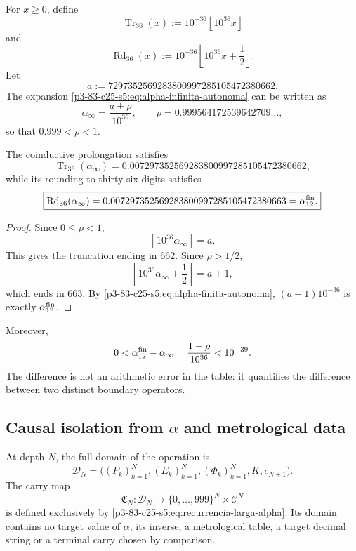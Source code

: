 For \(x\geq0\), define
\[
 \operatorname{Tr}_{36}(x)
 :=10^{-36}\left\lfloor10^{36}x\right\rfloor
\]
and
\[
 \operatorname{Rd}_{36}(x)
 :=10^{-36}\left\lfloor10^{36}x+\frac12\right\rfloor.
\]
Let
\[
 a:=7297352569283800997285105472380662.
\]
The expansion \eqref{p3-83-c25-s5:eq:alpha-infinita-autonoma} can be written as
\[
 \alpha_\infty=\frac{a+\rho}{10^{36}},
 \qquad
 \rho=0.999564172539642709\ldots,
\]
so that \(0.999<\rho<1\).

\begin{theorem}
\label{p3-83-c25-s5:thm:frontera-alpha-662-663}
The coinductive prolongation satisfies
\[
 \boxed{
 \operatorname{Tr}_{36}(\alpha_\infty)
 =0.007297352569283800997285105472380662,}
\]
while its rounding to thirty-six digits satisfies
\[
 \boxed{
 \operatorname{Rd}_{36}(\alpha_\infty)
 =0.007297352569283800997285105472380663
 =\alpha_{12}^{\rm fin}.}
\]
\end{theorem}

\begin{proof}
Since \(0\leq\rho<1\),
\[
 \left\lfloor10^{36}\alpha_\infty\right\rfloor=a.
\]
This gives the truncation ending in \(662\). Since \(\rho>1/2\),
\[
 \left\lfloor10^{36}\alpha_\infty+\frac12\right\rfloor=a+1,
\]
which ends in \(663\). By \eqref{p3-83-c25-s5:eq:alpha-finita-autonoma},
\((a+1)10^{-36}\) is exactly \(\alpha_{12}^{\rm fin}\).
\end{proof}

Moreover,
\[
 0<\alpha_{12}^{\rm fin}-\alpha_\infty
 =\frac{1-\rho}{10^{36}}<10^{-39}.
\]
The difference is not an arithmetic error in the table: it quantifies the
difference between two distinct boundary operators.

\subsection{Causal isolation from \texorpdfstring{\(\alpha\)}{alpha} and metrological data}

At depth \(N\), the full domain of the operation is
\[
 \mathscr D_N
 =\bigl((P_k)_{k=1}^{N},(E_k)_{k=1}^{N},
        (\Phi_k)_{k=1}^{N},K,c_{N+1}\bigr).
\]
The carry map
\[
 \mathfrak C_N:\mathscr D_N
 \longrightarrow
 \{0,\ldots,999\}^{N}\times\mathcal C^{N}
\]
is defined exclusively by \eqref{p3-83-c25-s5:eq:recurrencia-larga-alpha}. Its
domain contains no target value of \(\alpha\), its inverse, a metrological
table, a target decimal string or a terminal carry chosen by
comparison.

